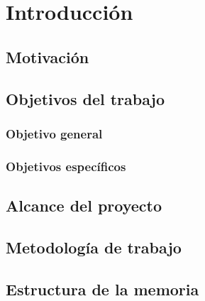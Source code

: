 \documentclass[../main.tex]{subfiles}
\begin{document}
\vspace{48pt}

\section{Introducción}

\subsection{Motivación}


\subsection{Objetivos del trabajo}

\subsubsection{Objetivo general}


\subsubsection{Objetivos específicos}


\subsection{Alcance del proyecto}


\subsection{Metodología de trabajo}


\subsection{Estructura de la memoria}

\end{document}
